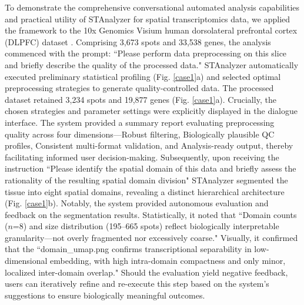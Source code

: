 \documentclass[11pt,a4paper]{article}
\begin{document}



To demonstrate the comprehensive conversational automated analysis capabilities and practical utility of STAnalyzer for spatial transcriptomics data, we applied the framework to the 10x Genomics Visium human dorsolateral prefrontal cortex (DLPFC) dataset \cite{maynard2021transcriptome}. Comprising 3,673 spots and 33,538 genes, the analysis commenced with the prompt: ``Please perform data preprocessing on this slice and briefly describe the quality of the processed data." STAnalyzer automatically executed preliminary statistical profiling (Fig. \ref{case1}a) and selected optimal preprocessing strategies to generate quality-controlled data. The processed dataset retained 3,234 spots and 19,877 genes (Fig. \ref{case1}a). Crucially, the chosen strategies and parameter settings were explicitly displayed in the dialogue interface. The system provided a summary report evaluating preprocessing quality across four dimensions—Robust filtering, Biologically plausible QC profiles, Consistent multi-format validation, and Analysis-ready output, thereby facilitating informed user decision-making. Subsequently, upon receiving the instruction ``Please identify the spatial domain of this data and briefly assess the rationality of the resulting spatial domain division" STAnalyzer segmented the tissue into eight spatial domains, revealing a distinct hierarchical architecture (Fig. \ref{case1}b). Notably, the system provided autonomous evaluation and feedback on the segmentation results. Statistically, it noted that ``Domain counts ($n$=8) and size distribution (195–665 spots) reflect biologically interpretable granularity—not overly fragmented nor excessively coarse." Visually, it confirmed that the ``domain\_umap.png confirms transcriptional separability in low-dimensional embedding, with high intra-domain compactness and only minor, localized inter-domain overlap." Should the evaluation yield negative feedback, users can iteratively refine and re-execute this step based on the system's suggestions to ensure biologically meaningful outcomes.
\end{document}
